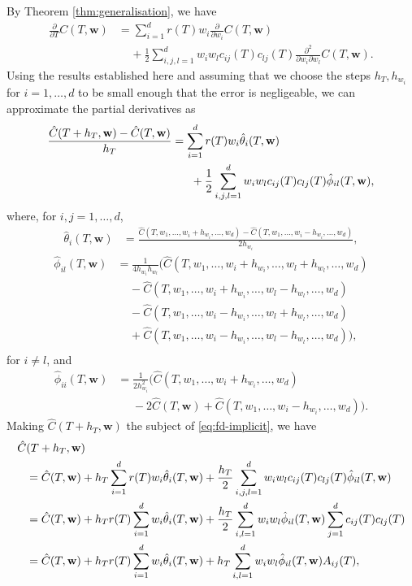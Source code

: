 \documentclass[english]{article}
\numberwithin{equation}{section}
\numberwithin{figure}{section}
\theoremstyle{bolddescit}
\theoremstyle{definition}
\theoremstyle{definition}
\theoremstyle{plain}
\theoremstyle{plain}
\theoremstyle{bolddesc}
\theoremstyle{plain}
\theoremstyle{remark}
\begin{document}
By Theorem \ref{thm:generalisation}, we have
\begin{align*}
  \frac{\partial}{\partial T} C(T,\mathbf{w})
  &= \sum_{i=1}^{d} r(T) w_i \frac{\partial}{\partial w_i} C(T,\mathbf{w})\\
  &\ \ \ \ \ + \frac{1}{2} \sum_{i,j,l=1}^{d} w_i w_l c_{ij}(T) c_{lj}(T) \frac{\partial^2}{\partial w_i \partial w_l} C(T,\mathbf{w}).
\end{align*}
Using the results established here and assuming that we choose the steps $h_T, h_{w_i}$ for $i=1,\ldots,d$ to be small enough that the error is negligeable, we can approximate the partial derivatives as
\begin{align}\label{eq:fd-implicit}
  \frac{\hat{C}(T+h_T,\mathbf{w}) - \hat{C}(T,\mathbf{w})}{h_T}
  &= \sum_{i=1}^{d} r(T) w_i \hat{\theta}_i(T,\mathbf{w})\notag\\
    &\ \ \ \ \ + \frac{1}{2} \sum_{i,j,l=1}^{d} w_i w_l c_{ij}(T) c_{lj}(T) \hat{\phi}_{il}(T,\mathbf{w}),
\end{align}
where, for $i,j=1,\ldots,d$,
\begin{align*}
  \hat{\theta}_i(T,\mathbf{w})
  &= \frac{\hat{C}(T,w_1,\ldots,w_i+h_{w_i},\ldots,w_d) - \hat{C}(T,w_1,\ldots,w_i-h_{w_i},\ldots,w_d)}{2h_{w_i}},
\end{align*}
\begin{align*}
  \hat{\phi}_{il}(T,\mathbf{w})
  &= \frac{1}{4 h_{w_i} h_{w_l}} \Bigg( \hat{C}(T,w_1,\ldots,w_i+h_{w_i},\ldots,w_l+h_{w_l},\ldots,w_d)\\
  &\ \ \ \ \ - \hat{C}(T,w_1,\ldots,w_i+h_{w_i},\ldots,w_l-h_{w_l},\ldots,w_d)\\
  &\ \ \ \ \ - \hat{C}(T,w_1,\ldots,w_i-h_{w_i},\ldots,w_l+h_{w_l},\ldots,w_d)\\
  &\ \ \ \ \ + \hat{C}(T,w_1,\ldots,w_i-h_{w_i},\ldots,w_l-h_{w_l},\ldots,w_d) \Bigg),\\
\end{align*}
for $i \neq l$, and
\begin{align*}
  \hat{\phi}_{ii}(T,\mathbf{w})
  &= \frac{1}{2 h_{w_i}^2} \Bigg( \hat{C}(T,w_1,\ldots,w_i+h_{w_i},\ldots,w_d)\\
  & \ \ \ \ \ \ - 2\hat{C}(T,\mathbf{w}) + \hat{C}(T,w_1,\ldots,w_i-h_{w_i},\ldots,w_d) \Bigg).
\end{align*}
Making $\hat{C}(T+h_T, \mathbf{w})$ the subject of \eqref{eq:fd-implicit}, we have
\begin{align}
  \hat{C}&(T+h_T,\mathbf{w})\notag\\
  &= \hat{C}(T,\mathbf{w}) + h_T \sum_{i=1}^{d} r(T) w_i \hat{\theta}_i(T,\mathbf{w})
     + \frac{h_T}{2} \sum_{i,j,l=1}^{d} w_i w_l c_{ij}(T) c_{lj}(T) \hat{\phi}_{il}(T,\mathbf{w})\notag\\
  &= \hat{C}(T,\mathbf{w}) + h_T r(T) \sum_{i=1}^{d} w_i \hat{\theta}_i(T,\mathbf{w}) + \frac{h_T}{2} \sum_{i,l=1}^{d} w_i w_l \hat{\phi}_{il}(T,\mathbf{w}) \sum_{j=1}^d c_{ij}(T) c_{lj}(T)\notag\\
  &= \hat{C}(T,\mathbf{w}) + h_T r(T) \sum_{i=1}^{d} w_i \hat{\theta}_i(T,\mathbf{w}) + h_T \sum_{i,l=1}^{d} w_i w_l \hat{\phi}_{il}(T,\mathbf{w}) A_{ij}(T),\label{eq:fd-chat-recur}
\end{align}
\end{document}
